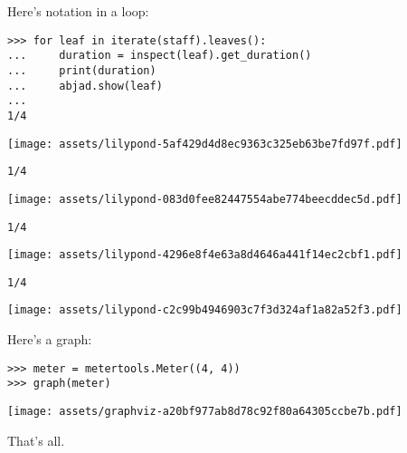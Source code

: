 \documentclass{article}
\begin{document}
Here's notation in a loop:

\begin{comment}
<abjad>
for leaf in iterate(staff).leaves():
    duration = inspect(leaf).get_duration()
    print(duration)
    abjad.show(leaf)

</abjad>
\end{comment}

\begin{singlespacing}
\begin{lstlisting}
>>> for leaf in iterate(staff).leaves():
...     duration = inspect(leaf).get_duration()
...     print(duration)
...     abjad.show(leaf)
...
1/4
\end{lstlisting}
\noindent\texttt{[image: assets/lilypond-5af429d4d8ec9363c325eb63be7fd97f.pdf]}
\begin{lstlisting}
1/4
\end{lstlisting}
\noindent\texttt{[image: assets/lilypond-083d0fee82447554abe774beecddec5d.pdf]}
\begin{lstlisting}
1/4
\end{lstlisting}
\noindent\texttt{[image: assets/lilypond-4296e8f4e63a8d4646a441f14ec2cbf1.pdf]}
\begin{lstlisting}
1/4
\end{lstlisting}
\noindent\texttt{[image: assets/lilypond-c2c99b4946903c7f3d324af1a82a52f3.pdf]}
\end{singlespacing}

Here's a graph:

\begin{comment}
<abjad>
meter = metertools.Meter((4, 4))
graph(meter)
</abjad>
\end{comment}

\begin{singlespacing}
\begin{lstlisting}
>>> meter = metertools.Meter((4, 4))
>>> graph(meter)
\end{lstlisting}
\noindent\texttt{[image: assets/graphviz-a20bf977ab8d78c92f80a64305ccbe7b.pdf]}
\end{singlespacing}

That's all.
\end{document}
